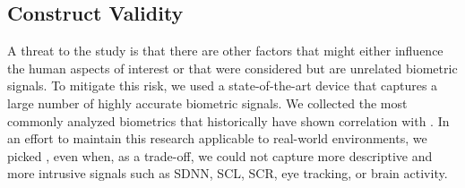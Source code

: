 \subsection{Construct Validity}
A threat to the study is that
there are other factors that might either influence the
human aspects of interest or that were considered but
are unrelated biometric signals.
To mitigate this risk, we used a state-of-the-art
device that captures a large number of highly accurate biometric
signals. We collected the most commonly analyzed
biometrics that historically have shown correlation with 
.
In an effort to maintain this research applicable to real-world environments, we picked , even when, as a trade-off, we could not capture more descriptive and more intrusive signals such as SDNN, SCL, SCR, eye tracking, or brain activity.












